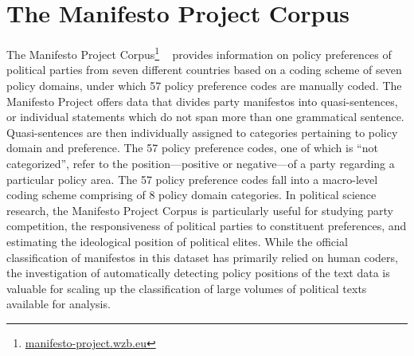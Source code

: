 \documentclass[11pt]{article}
\begin{document}

\section{The Manifesto Project Corpus}
\label{data}

The Manifesto Project Corpus\footnote{\url{manifesto-project.wzb.eu}} ~\cite{volkens2019manifesto} provides information on policy preferences of political parties from seven different countries based on a coding scheme of seven policy domains, under which 57 policy preference codes are manually coded. The Manifesto Project offers data that divides party manifestos into quasi-sentences, or individual statements which do not span more than one grammatical sentence. Quasi-sentences are then individually assigned to categories pertaining to policy domain and preference. The 57 policy preference codes, one of which is ``not categorized'', refer to the position---positive or negative---of a party regarding a particular policy area. The 57 policy preference codes fall into a macro-level coding scheme comprising of 8 policy domain categories. In political science research, the Manifesto Project Corpus is particularly useful for studying party competition, the responsiveness of political parties to constituent preferences, and estimating the ideological position of political elites. While the official classification of manifestos in this dataset has primarily relied on human coders, the investigation of automatically detecting policy positions of the text data is valuable for scaling up the classification of large volumes of political texts available for analysis.
\end{document}
